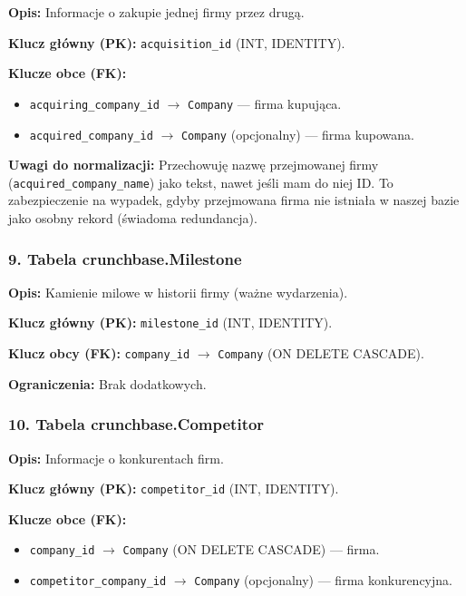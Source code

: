 \documentclass[12pt,a4paper]{article}
\begin{document}
\textbf{Opis:} Informacje o zakupie jednej firmy przez drugą.

\textbf{Klucz główny (PK):} \texttt{acquisition\_id} (INT, IDENTITY).

\textbf{Klucze obce (FK):}
\begin{itemize}[noitemsep]
    \item \texttt{acquiring\_company\_id} $\rightarrow$ \texttt{Company} --- firma kupująca.
    \item \texttt{acquired\_company\_id} $\rightarrow$ \texttt{Company} (opcjonalny) --- firma kupowana.
\end{itemize}

\textbf{Uwagi do normalizacji:} Przechowuję nazwę przejmowanej firmy (\texttt{acquired\_company\_name}) jako tekst, nawet jeśli mam do niej ID. To zabezpieczenie na wypadek, gdyby przejmowana firma nie istniała w naszej bazie jako osobny rekord (świadoma redundancja).

\subsubsection{9. Tabela crunchbase.Milestone}

\textbf{Opis:} Kamienie milowe w historii firmy (ważne wydarzenia).

\textbf{Klucz główny (PK):} \texttt{milestone\_id} (INT, IDENTITY).

\textbf{Klucz obcy (FK):} \texttt{company\_id} $\rightarrow$ \texttt{Company} (ON DELETE CASCADE).

\textbf{Ograniczenia:} Brak dodatkowych.

\subsubsection{10. Tabela crunchbase.Competitor}

\textbf{Opis:} Informacje o konkurentach firm.

\textbf{Klucz główny (PK):} \texttt{competitor\_id} (INT, IDENTITY).

\textbf{Klucze obce (FK):}
\begin{itemize}[noitemsep]
    \item \texttt{company\_id} $\rightarrow$ \texttt{Company} (ON DELETE CASCADE) --- firma.
    \item \texttt{competitor\_company\_id} $\rightarrow$ \texttt{Company} (opcjonalny) --- firma konkurencyjna.
\end{itemize}
\end{document}
